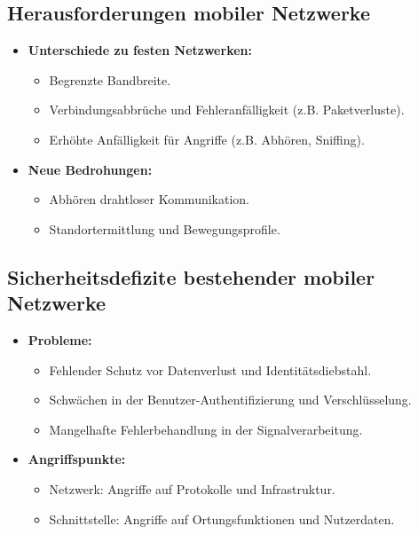 \documentclass{article}
\begin{document}
\subsection{Herausforderungen mobiler Netzwerke}
\begin{itemize}
    \item \textbf{Unterschiede zu festen Netzwerken:}
    \begin{itemize}
        \item Begrenzte Bandbreite.
        \item Verbindungsabbrüche und Fehleranfälligkeit (z.B. Paketverluste).
        \item Erhöhte Anfälligkeit für Angriffe (z.B. Abhören, Sniffing).
    \end{itemize}
    \item \textbf{Neue Bedrohungen:}
    \begin{itemize}
        \item Abhören drahtloser Kommunikation.
        \item Standortermittlung und Bewegungsprofile.
    \end{itemize}
\end{itemize}

\subsection{Sicherheitsdefizite bestehender mobiler Netzwerke}
\begin{itemize}
    \item \textbf{Probleme:}
    \begin{itemize}
        \item Fehlender Schutz vor Datenverlust und Identitätsdiebstahl.
        \item Schwächen in der Benutzer-Authentifizierung und Verschlüsselung.
        \item Mangelhafte Fehlerbehandlung in der Signalverarbeitung.
    \end{itemize}
    \item \textbf{Angriffspunkte:}
    \begin{itemize}
        \item Netzwerk: Angriffe auf Protokolle und Infrastruktur.
        \item Schnittstelle: Angriffe auf Ortungsfunktionen und Nutzerdaten.
    \end{itemize}
\end{itemize}
\end{document}
